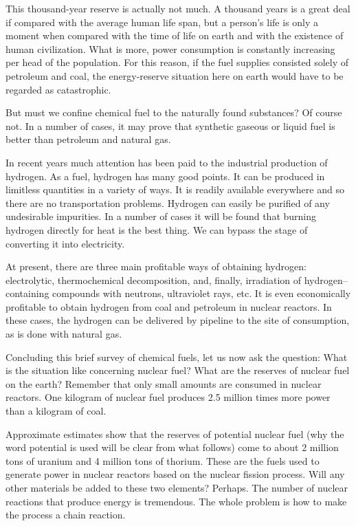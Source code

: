 This thousand-year reserve is actually not much. A thousand years is a great deal if compared with the average human life span, but a person's life is only a moment when compared with the time of life on earth and with the existence of human civilization. What is more, power consumption is constantly increasing per head of the population. For this reason, if the fuel supplies consisted solely of petroleum and coal, the energy-reserve situation here on earth would have to be regarded as catastrophic.

But must we confine chemical fuel to the naturally found substances? Of course not. In a number of cases, it may prove that synthetic gaseous or liquid fuel is better than petroleum and natural gas.

In recent years much attention has been paid to the industrial production of hydrogen. As a fuel, hydrogen has many good points. It can be produced in limitless quantities in a variety of ways. It is readily available everywhere and so there are no transportation problems. Hydrogen can easily be purified of any undesirable impurities. In a number of cases it will be found that burning hydrogen directly for heat is the best thing. We can bypass the stage of converting it into elec­tricity.

At present, there are three main profitable ways of obtaining hydrogen: electrolytic, thermochemical de­composition, and, finally, irradiation of hydrogen--con­taining compounds with neutrons, ultraviolet rays, etc. It is even economically profitable to obtain hydrogen from coal and petroleum in nuclear reactors. In these cases, the hydrogen can be delivered by pipeline to the site of consumption, as is done with natural gas.

Concluding this brief survey of chemical fuels, let us now ask the question: What is the situation like concerning nuclear fuel? What are the reserves of nuclear fuel on the earth? Remember that only small amounts are consumed in nuclear reactors. One kilogram of nuclear fuel produces 2.5 million times more power than a kilo­gram of coal.

Approximate estimates show that the reserves of poten­tial nuclear fuel (why the word potential is used will be clear from what follows) come to about 2 million tons of uranium and 4 million tons of thorium. These are the fuels used to generate power in nuclear reactors based on the nuclear fission process. Will any other materials be added to these two elements? Perhaps. The number of nuclear reactions that produce energy is tremendous. The whole problem is how to make the process a chain reaction.

